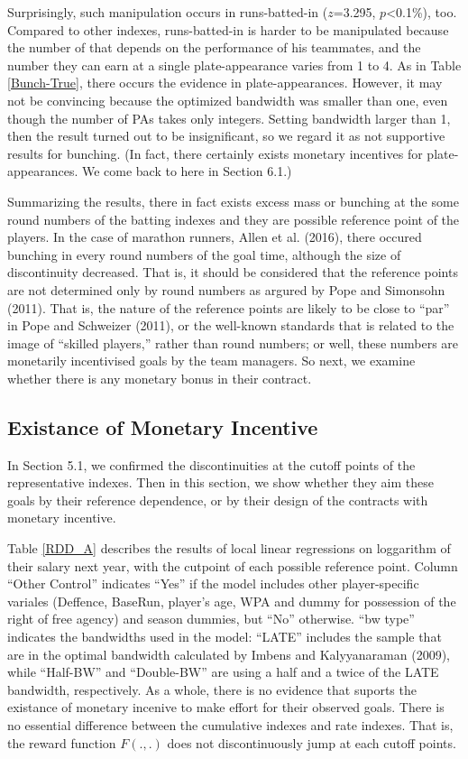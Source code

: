 \documentclass[dvipdfmx, 12pt]{article}
\begin{document}
Surprisingly, such manipulation occurs in runs-batted-in ($z$=3.295, $p$<0.1\%), too. Compared to other indexes, runs-batted-in is harder to be manipulated because the number of that depends on the performance of his teammates, and the number they can earn at a single plate-appearance varies from 1 to 4. As in Table \ref{Bunch-True}, there occurs the evidence in plate-appearances. However, it may not be convincing because the optimized bandwidth was smaller than one, even though the number of PAs takes only integers. Setting bandwidth larger than 1, then the result turned out to be insignificant, so we regard it as not supportive results for bunching. (In fact, there certainly exists monetary incentives for plate-appearances. We come back to here in Section 6.1.)

Summarizing the results, there in fact exists excess mass or bunching at the some round numbers of the batting indexes and they are possible reference point of the players. In the case of marathon runners, Allen et al. (2016), there occured bunching in every round numbers of the goal time, although the size of discontinuity decreased. That is, it should be considered that the reference points are not determined only by round numbers as argured by Pope and Simonsohn (2011). That is, the nature of the reference points are likely to be close to ``par'' in Pope and Schweizer (2011), or the well-known standards that is related to the image of ``skilled players,'' rather than round numbers; or well, these numbers are monetarily incentivised goals by the team managers. So next, we examine whether there is any monetary bonus in their contract.

\subsection{Existance of Monetary Incentive}

In Section 5.1, we confirmed the discontinuities at the cutoff points of the representative indexes. Then in this section, we show whether they aim these goals by their reference dependence, or by their design of the contracts with monetary incentive.

Table \ref{RDD_A} describes the results of local linear regressions on loggarithm of their salary next year, with the cutpoint of each possible reference point. Column ``Other Control'' indicates ``Yes'' if the model includes other player-specific variales (Deffence, BaseRun, player's age, WPA and dummy for possession of the right of free agency) and season dummies, but ``No'' otherwise. ``bw type'' indicates the bandwidths used in the model: ``LATE'' includes the sample that are in the optimal bandwidth calculated by Imbens and Kalyyanaraman (2009), while ``Half-BW'' and ``Double-BW'' are using a half and a twice of the LATE bandwidth, respectively. As a whole, there is no evidence that suports the existance of monetary incenive to make effort for their observed goals. There is no essential difference between the cumulative indexes and rate indexes. That is, the reward function $F(.,.)$ does not discontinuously jump at each cutoff points.
\end{document}
